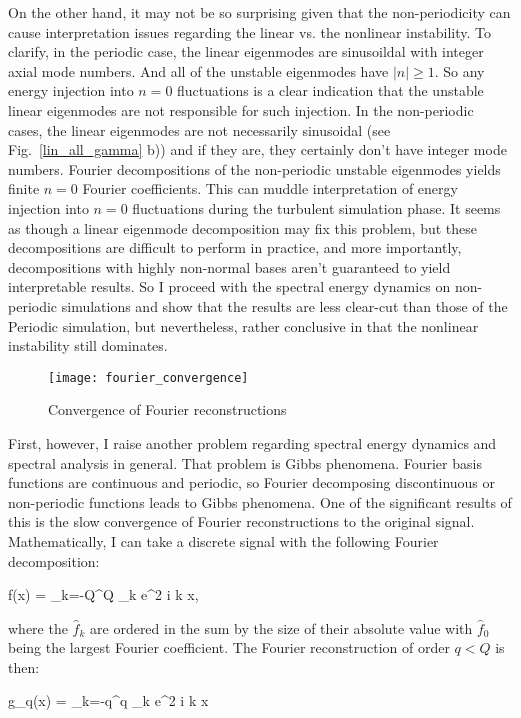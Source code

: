 On the other hand, it may not be so surprising given that the non-periodicity can cause interpretation issues regarding the linear vs. the nonlinear instability. 
To clarify, in the periodic case, the linear eigenmodes are sinusoildal with
integer axial mode numbers. And all of the unstable eigenmodes have $|n| \ge 1$. So any energy injection into $n=0$ fluctuations is a clear indication that the unstable linear eigenmodes are not
responsible for such injection. In the non-periodic cases, the linear eigenmodes are not necessarily sinusoidal (see Fig.~\ref{lin_all_gamma} b)) and if they are, they certainly don't have
integer mode numbers. Fourier decompositions of the non-periodic unstable eigenmodes yields finite $n=0$ Fourier coefficients. This can muddle interpretation of energy injection into $n=0$
fluctuations during the turbulent simulation phase. It seems as though a linear eigenmode decomposition may fix this problem, but these decompositions are difficult to perform in practice,
and more importantly, decompositions with highly non-normal bases aren't guaranteed to yield interpretable results. So I proceed with the spectral energy dynamics on non-periodic simulations
and show that the results are less clear-cut than those of the Periodic simulation, but nevertheless, rather conclusive in that the nonlinear instability still dominates.

\begin{figure}[!ht]
\centerline{\texttt{[image: fourier\_convergence]}}
\caption{Convergence of Fourier reconstructions}
\label{fourier_convergence}
\end{figure}

First, however, I raise another problem regarding spectral energy dynamics and spectral analysis in general. That problem is Gibbs phenomena.
Fourier basis functions are continuous and periodic, so Fourier decomposing
discontinuous or non-periodic functions leads to Gibbs phenomena. One of the significant results of this is the slow convergence of Fourier reconstructions to the original signal.
Mathematically, I can take a discrete signal with the following Fourier decomposition:

\beq
\label{f_decomp}
f(x) = \sum_{k=-Q}^{Q} _k e^{2 \pi i k x},
\eeq

where the $\hat{f}_k$ are ordered in the sum by the size of their absolute value with $\hat{f}_0$ being the largest Fourier coefficient. The Fourier reconstruction of order $q<Q$ is then:

\beq
\label{f_recon}
g_q(x) = \sum_{k=-q}^{q} _k e^{2 \pi i k x}
\eeq

